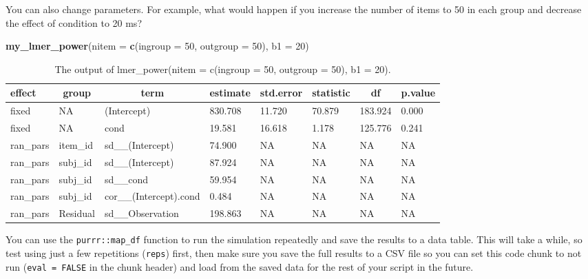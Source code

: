 \documentclass[man,floatsintext]{apa6}
\newenvironment{Shaded}{\begin{snugshade}}{\end{snugshade}}
\newcommand{\KeywordTok}[1]{\textcolor[rgb]{0.13,0.29,0.53}{\textbf{#1}}}
\newcommand{\DataTypeTok}[1]{\textcolor[rgb]{0.13,0.29,0.53}{#1}}
\newcommand{\DecValTok}[1]{\textcolor[rgb]{0.00,0.00,0.81}{#1}}
\newcommand{\NormalTok}[1]{#1}
\begin{document}
You can also change parameters. For example, what would happen if you
increase the number of items to 50 in each group and decrease the effect
of condition to 20 ms?

\begin{Shaded}
\begin{Highlighting}[]
\KeywordTok{my_lmer_power}\NormalTok{(}\DataTypeTok{nitem =} \KeywordTok{c}\NormalTok{(}\DataTypeTok{ingroup =} \DecValTok{50}\NormalTok{, }\DataTypeTok{outgroup =} \DecValTok{50}\NormalTok{), }\DataTypeTok{b1 =} \DecValTok{20}\NormalTok{)}
\end{Highlighting}
\end{Shaded}

\begin{table}[tbp]
\begin{center}
\begin{threeparttable}
\caption{\label{tab:unnamed-chunk-15}The output of lmer\_power(nitem = c(ingroup = 50, outgroup = 50), b1 = 20).}
\begin{tabular}{llllllll}
\toprule
effect & \multicolumn{1}{c}{group} & \multicolumn{1}{c}{term} & \multicolumn{1}{c}{estimate} & \multicolumn{1}{c}{std.error} & \multicolumn{1}{c}{statistic} & \multicolumn{1}{c}{df} & \multicolumn{1}{c}{p.value}\\
\midrule
fixed & NA & (Intercept) & 830.708 & 11.720 & 70.879 & 183.924 & 0.000\\
fixed & NA & cond & 19.581 & 16.618 & 1.178 & 125.776 & 0.241\\
ran\_pars & item\_id & sd\_\_(Intercept) & 74.900 & NA & NA & NA & NA\\
ran\_pars & subj\_id & sd\_\_(Intercept) & 87.924 & NA & NA & NA & NA\\
ran\_pars & subj\_id & sd\_\_cond & 59.954 & NA & NA & NA & NA\\
ran\_pars & subj\_id & cor\_\_(Intercept).cond & 0.484 & NA & NA & NA & NA\\
ran\_pars & Residual & sd\_\_Observation & 198.863 & NA & NA & NA & NA\\
\bottomrule
\end{tabular}
\end{threeparttable}
\end{center}
\end{table}

You can use the \texttt{purrr::map\_df} function to run the simulation
repeatedly and save the results to a data table. This will take a while,
so test using just a few repetitions (\texttt{reps}) first, then make
sure you save the full results to a CSV file so you can set this code
chunk to not run (\texttt{eval\ =\ FALSE} in the chunk header) and load
from the saved data for the rest of your script in the future.
\end{document}
